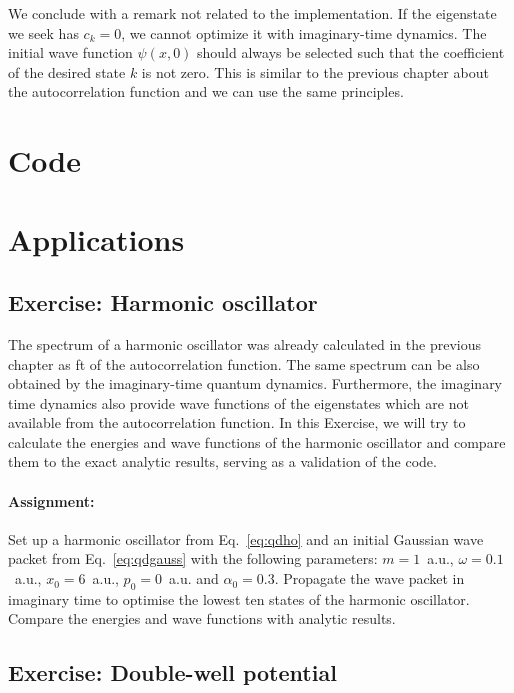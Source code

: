 We conclude with a remark not related to the implementation. If the eigenstate we seek has $c_k=0$, we cannot optimize it with imaginary-time dynamics. The initial wave function $\psi(x,0)$ should always be selected such that the coefficient of the desired state $k$ is not zero. This is similar to the previous chapter about the autocorrelation function and we can use the same principles. 


\section{Code}

\lstset{style=mystyle}


\section{Applications}

\subsection*{Exercise: Harmonic oscillator}

The spectrum of a harmonic oscillator was already calculated in the previous chapter as \acrlong{ft} of the autocorrelation function. The same spectrum can be also obtained by the imaginary-time quantum dynamics. Furthermore, the imaginary time dynamics also provide wave functions of the eigenstates which are not available from the autocorrelation function. In this Exercise, we will try to calculate the energies and wave functions of the harmonic oscillator and compare them to the exact analytic results, serving as a validation of the code.

\paragraph{Assignment:} Set up a harmonic oscillator from Eq.~\eqref{eq:qdho} and an initial Gaussian wave packet from Eq.~\eqref{eq:qdgauss} with the following parameters: $m=1$~a.u., $\omega=0.1$~a.u., $x_0=6$~a.u., $p_0=0$~a.u. and $\alpha_0 = 0.3$. Propagate the wave packet in imaginary time to optimise the lowest ten states of the harmonic oscillator. Compare the energies and wave functions with analytic results.

\subsection*{Exercise: Double-well potential}

